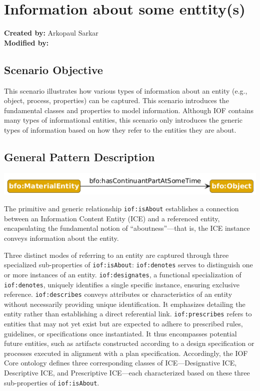 \section{Information about some enttity(s)}
\label{sec-information-about}

\textbf{Created by:} Arkopaul Sarkar \\
\textbf{Modified by:}

\subsection*{Scenario Objective}
This scenario illustrates how various types of information about an entity (e.g., object, process, properties) can be captured. This scenario introduces the fundamental classes and properties to model information. Although IOF contains many types of informational entities, this scenario only introduces the generic types of information based on how they refer to the entities they are about.  

\subsection*{General Pattern Description}

\includegraphics[scale=0.5]{scenarios/object-artifact-material/image/what-is-made-of-schema.png}

The primitive and generic relationship \texttt{iof:isAbout} establishes a connection between an Information Content Entity (ICE) and a referenced entity, encapsulating the fundamental notion of ``aboutness''—that is, the ICE instance conveys information about the entity.

Three distinct modes of referring to an entity are captured through three specialized sub-properties of \texttt{iof:isAbout}: \texttt{iof:denotes} serves to distinguish one or more instances of an entity.
\texttt{iof:designates}, a functional specialization of \texttt{iof:denotes}, uniquely identifies a single specific instance, ensuring exclusive reference.
\texttt{iof:describes} conveys attributes or characteristics of an entity without necessarily providing unique identification. It emphasizes detailing the entity rather than establishing a direct referential link.
\texttt{iof:prescribes} refers to entities that may not yet exist but are expected to adhere to prescribed rules, guidelines, or specifications once instantiated. It thus encompasses potential future entities, such as artifacts constructed according to a design specification or processes executed in alignment with a plan specification.
Accordingly, the IOF Core ontology defines three corresponding classes of ICE—Designative ICE, Descriptive ICE, and Prescriptive ICE—each characterized based on these three sub-properties of \texttt{iof:isAbout}. 

